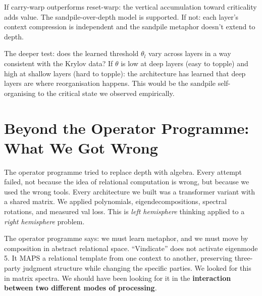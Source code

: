 \documentclass[11pt, a4paper]{article}
\theoremstyle{plain}
\theoremstyle{definition}
\theoremstyle{remark}
\begin{document}
If carry-warp outperforms reset-warp: the vertical accumulation toward criticality adds value.
The sandpile-over-depth model is supported.
If not: each layer's context compression is independent and the sandpile metaphor doesn't extend to depth.

The deeper test: does the learned threshold $\theta_l$ vary across layers in a way consistent with the Krylov data?
If $\theta$ is low at deep layers (easy to topple) and high at shallow layers (hard to topple): the architecture has learned that deep layers are where reorganisation happens.
This would be the sandpile self-organising to the critical state we observed empirically.


\section{Beyond the Operator Programme: What We Got Wrong}
\label{sec:beyond}

The operator programme tried to replace depth with algebra.
Every attempt failed, not because the idea of relational computation is wrong, but because we used the wrong tools.
Every architecture we built was a transformer variant with a shared matrix.
We applied polynomials, eigendecompositions, spectral rotations, and measured val loss.
This is \emph{left hemisphere} thinking applied to a \emph{right hemisphere} problem.

The operator programme says: we must learn metaphor, and we must move by composition in abstract relational space.
``Vindicate'' does not activate eigenmode 5.
It MAPS a relational template from one context to another, preserving three-party judgment structure while changing the specific parties.
We looked for this in matrix spectra.
We should have been looking for it in the \textbf{interaction between two different modes of processing}.
\end{document}
